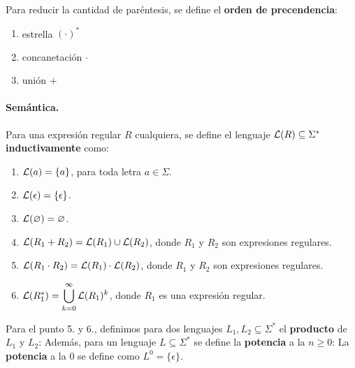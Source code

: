 Para reducir la cantidad de paréntesis, se define el \textbf{orden de precendencia}:
\begin{enumerate}
    \item estrella $(\cdot)^*$
    \item concanetación $\cdot$
    \item unión $+$
\end{enumerate}

\paragraph{Semántica.} Para una expresión regular $R$ cualquiera, se define el lenguaje $\mathcal{L}(R) \subseteq \Sigma^*$ \textbf{inductivamente} como:
\begin{enumerate}
    \item $\mathcal{L}(a) = \{a\}$, para toda letra $a \in \Sigma$.
    \item $\mathcal{L}(\epsilon) = \{\epsilon\}$.
    \item $\mathcal{L}(\varnothing) = \varnothing$.
    \item $\mathcal{L}(R_1 + R_2) = \mathcal{L}(R_1) \cup \mathcal{L}(R_2)$, donde $R_1$ y $R_2$ son expresiones regulares.
    \item $\mathcal{L}(R_1 \cdot R_2) = \mathcal{L}(R_1)\cdot \mathcal{L}(R_2)$, donde $R_1$ y $R_2$ son expresiones regulares.
    \item $\mathcal{L}(R_1^*)=\displaystyle\bigcup_{k=0}^\infty \mathcal{L}(R_1)^k$, donde $R_1$ es una expresión regular.
\end{enumerate}

Para el punto 5. y 6., definimos para dos lenguajes $L_1,L_2 \subseteq \Sigma^*$ el \textbf{producto} de $L_1$ y $L_2$:
Además, para un lenguaje $L\subseteq \Sigma^*$ se define la \textbf{potencia} a la $n \ge 0$:
La \textbf{potencia} a la $0$ se define como $L^0 = \{\epsilon\}$.



